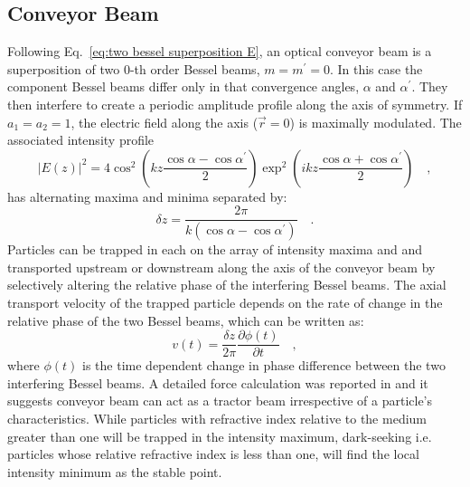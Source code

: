 \subsection{Conveyor Beam}
Following Eq.~\eqref{eq:two bessel superposition E}, an optical conveyor beam is a superposition of two $0$-th order Bessel beams, $m=m^{\prime} = 0$. In this case the component Bessel beams differ only in that convergence angles, $\alpha$ and $\alpha ^{\prime}$. They then interfere to create a periodic amplitude profile along the axis of symmetry. If $a_1 = a_2 = 1$, the electric field along the axis ($\vec{r}=0$) is maximally modulated. The associated intensity profile
\begin{equation}
\label{eq:conveyor electric field axis}
\vert E(z) \vert ^2 = 4 \cos ^2 \left( kz\frac{\cos \alpha - \cos \alpha ^{\prime}}{2}\right) \exp ^2 \left( ikz \frac{\cos \alpha + \cos \alpha ^{\prime}}{2}\right) \quad ,
\end{equation}
has alternating maxima and minima separated by:
\begin{equation}
\label{eq:conveyor period}
\delta z = \frac{2\pi}{k \left( \cos \alpha - \cos \alpha ^{\prime}\right)} \quad .
\end{equation}
Particles can be trapped in each on the array of intensity maxima and and transported upstream or downstream along the axis of the conveyor beam by selectively altering the relative phase of the interfering Bessel beams. The axial transport velocity of the trapped particle depends on the rate of change in the relative phase of the two Bessel beams, which can be written as:
\begin{equation}
\label{eq:conveyor velocity}
v(t) = \frac{\delta z}{2\pi}\frac{\partial \phi (t)}{\partial t} \quad ,
\end{equation}
where $\phi (t)$ is the time dependent change in phase difference between the two interfering Bessel beams. A detailed force calculation was reported in \cite{ruffner2012prl} and it suggests conveyor beam can act as a tractor beam irrespective of a particle's characteristics. While particles with refractive index relative to the medium greater than one will be trapped in the intensity maximum, dark-seeking i.e. particles whose relative refractive index is less than one, will find the local intensity minimum as the stable point.


